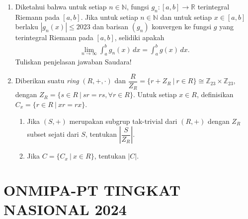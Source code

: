 \documentclass[12pt,twoside]{article}
\begin{document}
\begin{enumerate}
\begin{enumerate}
          \end{enumerate}
    \item Diketahui bahwa untuk setiap $n\in\mathbb{N}$, fungsi $g_n:[a,b]\to \mathbb{R}$ terintegral Riemann pada $[a,b]$. Jika untuk setiap $n\in\mathbb{N}$ dan untuk setiap $x\in[a,b]$ berlaku $|g_n(x)|\leq 2023$ dan barisan $(g_n)$ konvergen ke fungsi $g$ yang terintegral Riemann pada $[a,b]$, selidiki apakah
          \begin{align*}
              \lim_{n\to\infty}\int_a^b g_n(x)\, dx=\int_a^b g(x)\, dx.
          \end{align*}
          Tuliskan penjelasan jawaban Saudara!
    \item Diberikan suatu \textit{ring} $(R,+,\cdot)$ dan $\dfrac{R}{Z_R}=\{r+Z_R~|~r\in R\}\cong \mathbb{Z}_{23}\times \mathbb{Z}_{23}$, dengan $Z_R=\{s\in R~|~sr=rs,\forall r\in R\}$. Untuk setiap $x\in R$, definisikan $C_x=\{r\in R~|~xr=rx\}$.
          \begin{enumerate}
              \item Jika $(S,+)$ merupakan subgrup tak-trivial dari $(R,+)$ dengan $Z_R$ subset sejati dari $S$, tentukan $\left|\dfrac{S}{Z_R}\right|$.
              \item Jika $C=\{C_x~|~x\in R\}$, tentukan $|C|$.
          \end{enumerate}
\end{enumerate}
\pagebreak

\section{ONMIPA-PT TINGKAT NASIONAL 2024}
\end{document}
